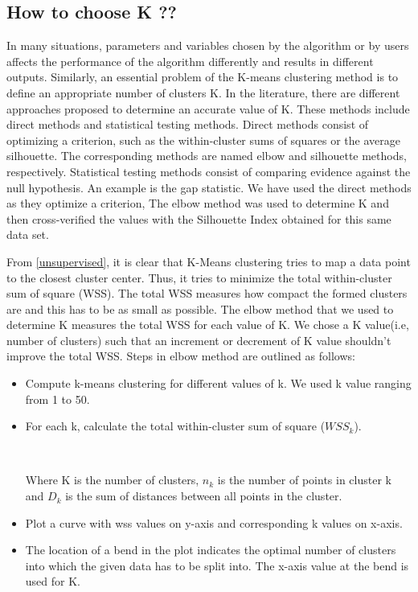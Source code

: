 \subsection{How to choose K ??}
 In many situations, parameters and variables chosen by the algorithm or by users affects the performance of the algorithm differently and results in different outputs. Similarly, an essential problem of the K-means clustering method is to define an appropriate number of clusters K. In the literature, there are different approaches proposed to determine an accurate value of K.
 These methods include direct methods and statistical testing methods. Direct methods consist of optimizing a criterion, such as the within-cluster sums of squares or the average silhouette. The corresponding methods are named elbow and silhouette methods, respectively. Statistical testing methods consist of comparing evidence against the null hypothesis. An example is the gap statistic. We have used the direct methods as they optimize a criterion, The elbow method was used to determine K and then cross-verified the values with the Silhouette Index obtained for this same data set.
 
 From \ref{unsupervised}, it is clear that K-Means clustering tries to map a data point to the closest cluster center. Thus, it tries to minimize the total within-cluster sum of square (WSS). The total WSS measures how compact the formed clusters are and this has to be as small as possible. The elbow method that we used to determine K measures the total WSS for each value of K. We chose a K value(i.e, number of clusters) such that an increment or decrement of K value shouldn't improve the total WSS. 
 Steps in elbow method are outlined as follows:
 \begin{itemize}
 	\item Compute k-means clustering for different values of k. We used k value ranging from 1 to 50.
 	
 	\item For each k, calculate the total within-cluster sum of square ($WSS_k$).
 	\begin{center}
 	 		 \\
 	 	
 	 	
 	\end{center}  
    Where K is the number of clusters, $n_k$ is the number of points in cluster k and $D_k$ is the sum of distances between all points in the cluster.
 	\item Plot a curve with wss values on y-axis and corresponding k values on x-axis. 	
 	\item The location of a bend in the plot indicates the optimal number of clusters into which the given data has to be split into. The x-axis value at the bend is used for K.
 \end{itemize}

